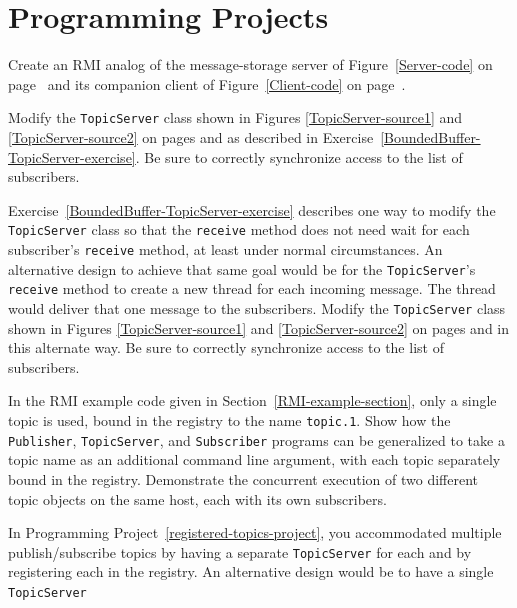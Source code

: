 \section*{Programming Projects}
\begin{chapterEnumerate}
\item
Create an RMI analog of the
message-storage server of Figure~\ref{Server-code} on
page~\pageref{Server-code} and its companion client of
Figure~\ref{Client-code} on page~\pageref{Client-code}.
\item\label{BoundedBuffer-TopicServer-project}
Modify the {\tt TopicServer} class shown in
Figures \ref{TopicServer-source1} and \ref{TopicServer-source2} on pages \pageref{TopicServer-source1} and \pageref{TopicServer-source2}
as described in Exercise~\ref{BoundedBuffer-TopicServer-exercise}.  Be
sure to correctly synchronize access to the list of subscribers.
\item\label{Spawning-TopicServer-project}
Exercise~\ref{BoundedBuffer-TopicServer-exercise} describes one way to
modify the {\tt TopicServer} class so that the {\tt receive} method
does not need wait for each subscriber's {\tt receive} method, at least
under normal circumstances.  An alternative design to achieve that
same goal would be for the {\tt TopicServer}'s {\tt receive} method to
create a new thread for each incoming message.  The thread would deliver
that one message to the subscribers.  Modify the {\tt TopicServer} class shown in
Figures \ref{TopicServer-source1} and \ref{TopicServer-source2} on pages \pageref{TopicServer-source1} and \pageref{TopicServer-source2}
in this alternate way.  Be
sure to correctly synchronize access to the list of subscribers.
\item\label{registered-topics-project}
In the RMI example code given in Section~\ref{RMI-example-section}, only a single topic
is used, bound in the registry to the name {\tt topic.1}.  Show how
the {\tt Publisher}, {\tt TopicServer}, and {\tt Subscriber} programs
can be generalized to take a topic name as an additional command line
argument, with each topic separately bound in the registry.
Demonstrate the concurrent execution of two different topic objects on
the same host,
each with its own subscribers.
\item\label{multi-topic-server-project}
In Programming Project~\ref{registered-topics-project}, you
accommodated multiple publish/\linebreak[0]subscribe topics by having a separate
{\tt TopicServer} for each and by registering each in the registry.
An alternative design would be to have a single {\tt TopicServer}

\end{chapterEnumerate}
